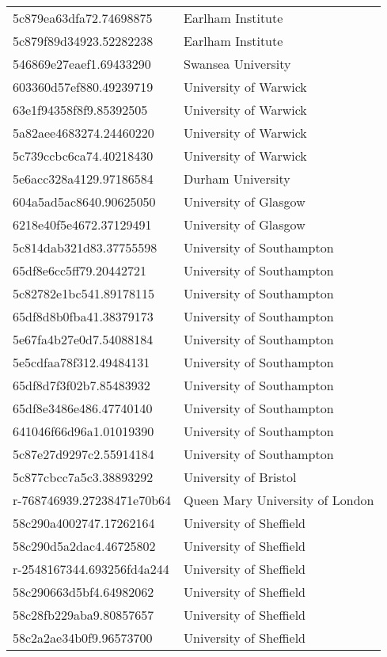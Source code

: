\begin{tabular}{ll}
5c879ea63dfa72.74698875 & Earlham Institute \\
5c879f89d34923.52282238 & Earlham Institute \\
546869e27eaef1.69433290 & Swansea University \\
603360d57ef880.49239719 & University of Warwick \\
63e1f94358f8f9.85392505 & University of Warwick \\
5a82aee4683274.24460220 & University of Warwick \\
5c739ccbc6ca74.40218430 & University of Warwick \\
5e6acc328a4129.97186584 & Durham University \\
604a5ad5ac8640.90625050 & University of Glasgow \\
6218e40f5e4672.37129491 & University of Glasgow \\
5c814dab321d83.37755598 & University of Southampton \\
65df8e6cc5ff79.20442721 & University of Southampton \\
5c82782e1bc541.89178115 & University of Southampton \\
65df8d8b0fba41.38379173 & University of Southampton \\
5e67fa4b27e0d7.54088184 & University of Southampton \\
5e5cdfaa78f312.49484131 & University of Southampton \\
65df8d7f3f02b7.85483932 & University of Southampton \\
65df8e3486e486.47740140 & University of Southampton \\
641046f66d96a1.01019390 & University of Southampton \\
5c87e27d9297c2.55914184 & University of Southampton \\
5c877cbcc7a5c3.38893292 & University of Bristol \\
r-768746939.27238471e70b64 & Queen Mary University of London \\
58c290a4002747.17262164 & University of Sheffield \\
58c290d5a2dac4.46725802 & University of Sheffield \\
r-2548167344.693256fd4a244 & University of Sheffield \\
58c290663d5bf4.64982062 & University of Sheffield \\
58c28fb229aba9.80857657 & University of Sheffield \\
58c2a2ae34b0f9.96573700 & University of Sheffield \\

\end{tabular}
